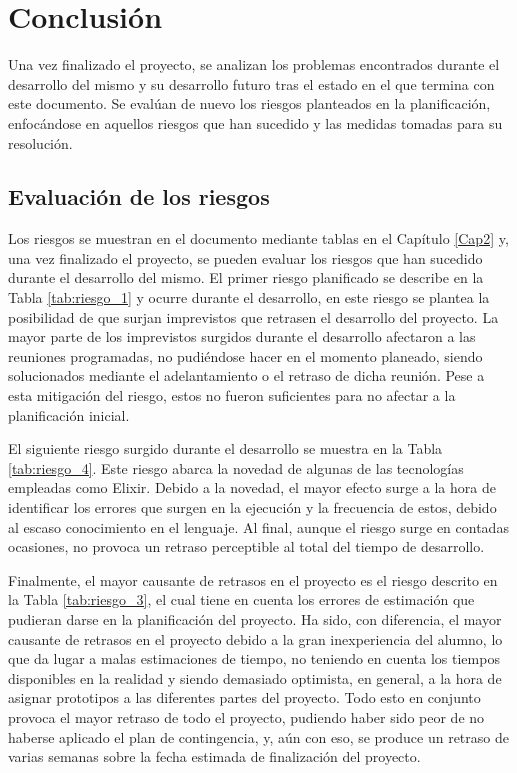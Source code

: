 \chapter{Conclusión}\label{Cap7}

Una vez finalizado el proyecto, se analizan los problemas encontrados durante el desarrollo del mismo y su desarrollo futuro tras el estado en el que termina con este documento. Se evalúan de nuevo los riesgos planteados en la planificación, enfocándose en aquellos riesgos que han sucedido y las medidas tomadas para su resolución.

\section{Evaluación de los riesgos}

Los riesgos se muestran en el documento mediante tablas en el Capítulo \ref{Cap2} y, una vez finalizado el proyecto, se pueden evaluar los riesgos que han sucedido durante el desarrollo del mismo. El primer riesgo planificado se describe en la Tabla \ref{tab:riesgo_1} y ocurre durante el desarrollo, en este riesgo se plantea la posibilidad de que surjan imprevistos que retrasen el desarrollo del proyecto. La mayor parte de los imprevistos surgidos durante el desarrollo afectaron a las reuniones programadas, no pudiéndose hacer en el momento planeado, siendo solucionados mediante el adelantamiento o el retraso de dicha reunión. Pese a esta mitigación del riesgo, estos no fueron suficientes para no afectar a la planificación inicial.

El siguiente riesgo surgido durante el desarrollo se muestra en la Tabla \ref{tab:riesgo_4}. Este riesgo abarca la novedad de algunas de las tecnologías empleadas como Elixir. Debido a la novedad, el mayor efecto surge a la hora de identificar los errores que surgen en la ejecución y la frecuencia de estos, debido al escaso conocimiento en el lenguaje. Al final, aunque el riesgo surge en contadas ocasiones, no provoca un retraso perceptible al total del tiempo de desarrollo.

Finalmente, el mayor causante de retrasos en el proyecto es el riesgo descrito en la Tabla \ref{tab:riesgo_3}, el cual tiene en cuenta los errores de estimación que pudieran darse en la planificación del proyecto. Ha sido, con diferencia, el mayor causante de retrasos en el proyecto debido a la gran inexperiencia del alumno, lo que da lugar a malas estimaciones de tiempo, no teniendo en cuenta los tiempos disponibles en la realidad y siendo demasiado optimista, en general, a la hora de asignar prototipos a las diferentes partes del proyecto. Todo esto en conjunto provoca el mayor retraso de todo el proyecto, pudiendo haber sido peor de no haberse aplicado el plan de contingencia, y, aún con eso, se produce un retraso de varias semanas sobre la fecha estimada de finalización del proyecto.

